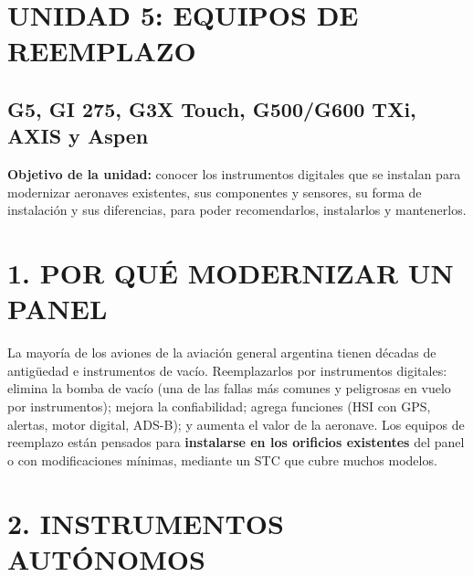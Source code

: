 \clearpage
\section*{UNIDAD 5: EQUIPOS DE REEMPLAZO}
\subsection*{G5, GI 275, G3X Touch, G500/G600 TXi, AXIS y Aspen}

\begin{recuadro}
\textbf{Objetivo de la unidad:} conocer los instrumentos digitales que se instalan para
modernizar aeronaves existentes, sus componentes y sensores, su forma de instalación y sus
diferencias, para poder recomendarlos, instalarlos y mantenerlos.
\end{recuadro}

\section*{1. POR QUÉ MODERNIZAR UN PANEL}

La mayoría de los aviones de la aviación general argentina tienen décadas de antigüedad e
instrumentos de vacío. Reemplazarlos por instrumentos digitales: elimina la bomba de vacío (una de
las fallas más comunes y peligrosas en vuelo por instrumentos); mejora la confiabilidad; agrega
funciones (HSI con GPS, alertas, motor digital, ADS-B); y aumenta el valor de la aeronave. Los
equipos de reemplazo están pensados para \textbf{instalarse en los orificios existentes} del panel
o con modificaciones mínimas, mediante un STC que cubre muchos modelos.

\section*{2. INSTRUMENTOS AUTÓNOMOS}

